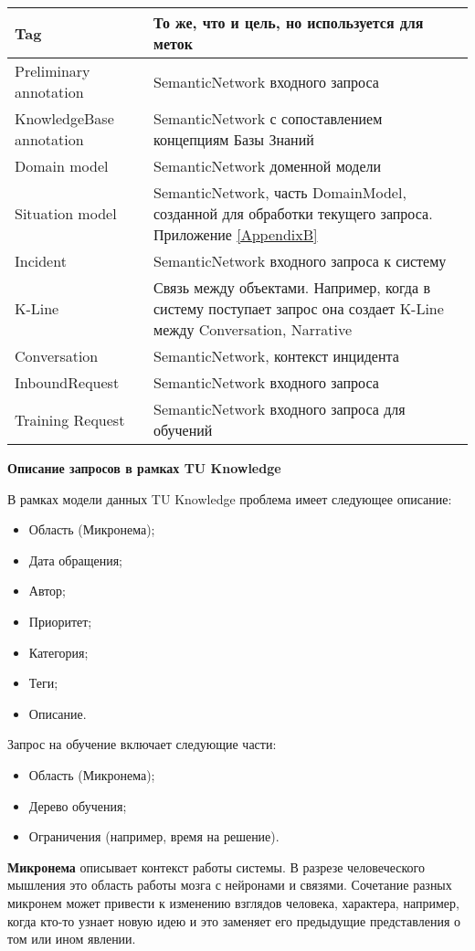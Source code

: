\begin{longtable}{|p{5cm}|p{12cm}|}
   \hline
   Tag & То же, что и цель, но используется для меток \\
   \hline
   Preliminary annotation  & SemanticNetwork входного запроса \\
   \hline
   KnowledgeBase annotation  & SemanticNetwork с сопоставлением концепциям Базы Знаний \\
   \hline
   Domain model  & SemanticNetwork доменной модели \\
   \hline
   Situation model  & SemanticNetwork, часть DomainModel, созданной для обработки текущего запроса. Приложение \ref{AppendixB} \\
   \hline
   Incident  & SemanticNetwork входного запроса к систему \\
   \hline
   K-Line  & Связь между объектами. Например, когда в систему поступает запрос она создает K-Line между Conversation, Narrative \\
   \hline
   Conversation  & SemanticNetwork, контекст инцидента \\
   \hline
   InboundRequest  & SemanticNetwork входного запроса \\
   \hline
   Training Request  & SemanticNetwork входного запроса для обучений \\
   \hline
   
  \end{longtable}

\textbf{Описание запросов в рамках TU Knowledge} \par
В рамках модели данных TU Knowledge проблема имеет следующее описание:
\begin{itemize}
	\item Область (Микронема);
	\item Дата обращения;
	\item Автор;
	\item Приоритет;
	\item Категория;
	\item Теги;
	\item Описание.
\end{itemize}
Запрос на обучение включает следующие части:
\begin{itemize}
	\item Область (Микронема);
	\item Дерево обучения;
	\item Ограничения (например, время на решение).
\end{itemize} \par
 \textbf{Микронема} описывает контекст работы системы. В разрезе человеческого мышления это область работы мозга с нейронами и связями. Сочетание разных микронем может привести к изменению взглядов человека, характера, например, когда кто-то узнает новую идею и это заменяет его предыдущие представления о том или ином явлении. \par 

